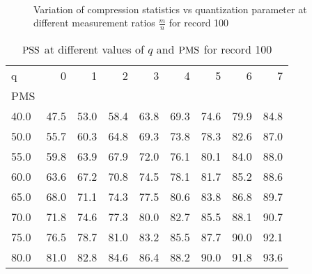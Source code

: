 \begin{figure*}[htb]
    \centering %

    \hfill
    \hfill
    \\
    \hfill
    \hfill
  \caption{Variation of compression statistics vs quantization parameter
  at different measurement ratios $\frac{m}{n}$
  for record 100}
\label{fig:cs:codec:100:q:mr:stats}
\end{figure*}

\begin{table}[ht]
\tiny
\centering
\caption{$\mathrm{PSS}$
at different values of $q$ and $\mathrm{PMS}$ for record 100}
\begin{tabular}{lrrrrrrrr}
\toprule
q &    0 &    1 &    2 &    3 &    4 &    5 &    6 &    7 \\
PMS  &      &      &      &      &      &      &      &      \\
\midrule
40.0 & 47.5 & 53.0 & 58.4 & 63.8 & 69.3 & 74.6 & 79.9 & 84.8 \\
50.0 & 55.7 & 60.3 & 64.8 & 69.3 & 73.8 & 78.3 & 82.6 & 87.0 \\
55.0 & 59.8 & 63.9 & 67.9 & 72.0 & 76.1 & 80.1 & 84.0 & 88.0 \\
60.0 & 63.6 & 67.2 & 70.8 & 74.5 & 78.1 & 81.7 & 85.2 & 88.6 \\
65.0 & 68.0 & 71.1 & 74.3 & 77.5 & 80.6 & 83.8 & 86.8 & 89.7 \\
70.0 & 71.8 & 74.6 & 77.3 & 80.0 & 82.7 & 85.5 & 88.1 & 90.7 \\
75.0 & 76.5 & 78.7 & 81.0 & 83.2 & 85.5 & 87.7 & 90.0 & 92.1 \\
80.0 & 81.0 & 82.8 & 84.6 & 86.4 & 88.2 & 90.0 & 91.8 & 93.6 \\
\bottomrule
\end{tabular}
\label{tbl:cs:codec:100:pms:pss:q}
\end{table}



